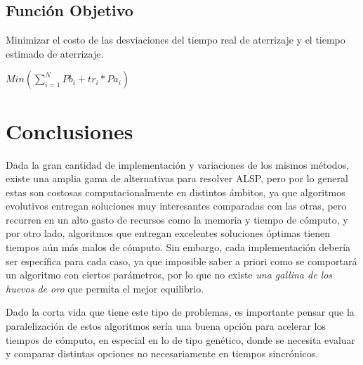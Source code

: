 \documentclass[letter, 11pt]{article}
\begin{document}
\subsection{Función Objetivo}
Minimizar el costo de las desviaciones del tiempo real de aterrizaje y el tiempo estimado de aterrizaje.

$Min (\sum\limits_{i=1}^N Pb_i+tr_i * Pa_i)$

\section{Conclusiones}
Dada la gran cantidad de implementación y variaciones de los mismos métodos, existe una amplia gama de alternativas para resolver ALSP, pero por lo general estas son costosas computacionalmente en distintos ámbitos, ya que algoritmos evolutivos entregan soluciones muy interesantes comparadas con las otras, pero recurren en un alto gasto de recursos como la memoria y tiempo de cómputo, y por otro lado, algoritmos que entregan excelentes soluciones óptimas tienen tiempos aún más malos de cómputo. Sin embargo, cada implementación debería ser específica para cada caso, ya que imposible saber a priori como se comportará un algoritmo con ciertos parámetros, por lo que no existe \textit{una gallina de los huevos de oro} que permita el mejor equilibrio.

Dado la corta vida que tiene este tipo de problemas, es importante pensar que la paralelización de estos algoritmos sería una buena opción para acelerar los tiempos de cómputo, en especial en lo de tipo genético, donde se necesita evaluar y comparar distintas opciones no necesariamente en tiempos sincrónicos.
\end{document}
